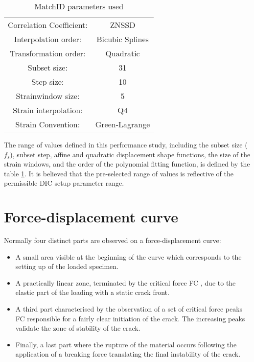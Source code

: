 \begin{table}[]
	\centering
	\begin{tabular}{c c}
		\hline
		Correlation   Coefficient: & ZNSSD \\ 
		Interpolation order: & Bicubic Splines \\ 
		Transformation order: & Quadratic \\
		Subset size: & 31 \\
		Step size: & 10 \\
		Strainwindow size: & 5 \\ 
		Strain interpolation: & Q4 \\ 
		Strain Convention: & Green-Lagrange \\ \hline
	\end{tabular}
	\caption{MatchID parameters used}
	\label{tab:MatchID_param}
\end{table}

The range of values defined in this performance study, including the subset size ($f_s$), subset step, affine and quadratic displacement shape functions, the size of the strain windows, and the order of the polynomial fitting function, is defined by the table \ref{tab:MatchID_param}. It is believed that the pre-selected range of values is reflective of the permissible DIC setup parameter range.

\section{Force-displacement curve}

Normally four distinct parts are observed on a force-displacement curve:

\begin{itemize}
	\item A small area visible at the beginning of the curve which corresponds to the setting up of the loaded specimen. 
	\item A practically linear zone, terminated by the critical force FC , due to the elastic part of the loading with a static crack front.
	\item A third part characterised by the observation of a set of critical force peaks FC responsible for a fairly clear initiation of the crack. The increasing peaks validate the zone of stability of the crack.
	\item Finally, a last part where the rupture of the material occurs following the application of a breaking force translating the final instability of the crack.
\end{itemize}

